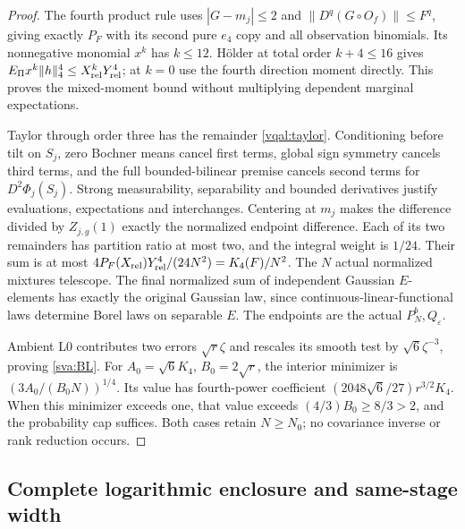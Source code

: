 \documentclass[11pt]{article}
\theoremstyle{plain}
\theoremstyle{definition}
\theoremstyle{remark}
\begin{document}
\begin{proof}
The fourth product rule uses $|G-m_j|\le2$ and
$\|D^q(G\circ O_f)\|\le F^q$, giving exactly $P_F$ with its second
pure $e_4$ copy and all observation binomials. Its nonnegative monomial
$x^k$ has $k\le12$. H\"older at total order $k+4\le16$ gives
$E_\Pi x^k\|h\|_4^4\le X_{\rm rel}^kY_{\rm rel}^4$; at $k=0$ use
the fourth direction moment directly. This proves the mixed-moment
bound without multiplying dependent marginal expectations.

Taylor through order three has the remainder \eqref{vqal:taylor}.
Conditioning before tilt on $S_j$, zero Bochner means cancel first
terms, global sign symmetry cancels third terms, and the full
bounded-bilinear premise cancels second terms for
$D^2\Phi_j(S_j)$. Strong measurability, separability and bounded
derivatives justify evaluations, expectations and interchanges. Centering
at $m_j$ makes the difference divided by $Z_{j,g}(1)$ exactly the
normalized endpoint difference. Each of its two remainders has partition
ratio at most two, and the integral weight is $1/24$. Their sum is at
most $4P_F(X_{\rm rel})Y_{\rm rel}^4/(24N^2)=K_4(F)/N^2$.
The $N$ actual normalized mixtures telescope. The final normalized sum
of independent Gaussian $E$-elements has exactly the original Gaussian
law, since continuous-linear-functional laws determine Borel laws on
separable $E$. The endpoints are the actual $P_N^b,Q_\varepsilon$.

Ambient L0 contributes two errors $\sqrt r\zeta$ and rescales its
smooth test by $\sqrt6\zeta^{-3}$, proving \eqref{sva:BL}.
For $A_0=\sqrt6K_4$, $B_0=2\sqrt r$, the interior minimizer is
$(3A_0/(B_0N))^{1/4}$. Its value has fourth-power coefficient
$(2048\sqrt6/27)r^{3/2}K_4$. When this minimizer exceeds one, that
value exceeds $(4/3)B_0\ge8/3>2$, and the probability cap suffices.
Both cases retain $N\ge N_0$; no covariance inverse or rank reduction
occurs.
\end{proof}

\subsection{Complete logarithmic enclosure and same-stage width}
\label{sva:enclosure}
\end{document}
